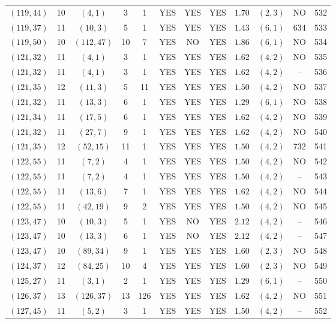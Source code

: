 \begin{longtable}{|c|c|c|c|c|c|c|c|c|c|c|c|}
$(119,44)$ & 10 & $(4,1)$ & 3 & 1 & YES & YES & YES & $1.70$ & $(2,3)$ & NO & 532\\
$(119,37)$ & 11 & $(10,3)$ & 5 & 1 & YES & YES & YES & $1.43$ & $(6,1)$ & 634 & 533\\
$(119,50)$ & 10 & $(112,47)$ & 10 & 7 & YES & NO & YES & $1.86$ & $(6,1)$ & NO & 534\\
$(121,32)$ & 11 & $(4,1)$ & 3 & 1 & YES & YES & YES & $1.62$ & $(4,2)$ & NO & 535\\
$(121,32)$ & 11 & $(4,1)$ & 3 & 1 & YES & YES & YES & $1.62$ & $(4,2)$ & -- & 536\\
$(121,35)$ & 12 & $(11,3)$ & 5 & 11 & YES & YES & YES & $1.50$ & $(4,2)$ & NO & 537\\
$(121,32)$ & 11 & $(13,3)$ & 6 & 1 & YES & YES & YES & $1.29$ & $(6,1)$ & NO & 538\\
$(121,34)$ & 11 & $(17,5)$ & 6 & 1 & YES & YES & YES & $1.62$ & $(4,2)$ & NO & 539\\
$(121,32)$ & 11 & $(27,7)$ & 9 & 1 & YES & YES & YES & $1.62$ & $(4,2)$ & NO & 540\\
$(121,35)$ & 12 & $(52,15)$ & 11 & 1 & YES & YES & YES & $1.50$ & $(4,2)$ & 732 & 541\\
$(122,55)$ & 11 & $(7,2)$ & 4 & 1 & YES & YES & YES & $1.50$ & $(4,2)$ & NO & 542\\
$(122,55)$ & 11 & $(7,2)$ & 4 & 1 & YES & YES & YES & $1.50$ & $(4,2)$ & -- & 543\\
$(122,55)$ & 11 & $(13,6)$ & 7 & 1 & YES & YES & YES & $1.62$ & $(4,2)$ & NO & 544\\
$(122,55)$ & 11 & $(42,19)$ & 9 & 2 & YES & YES & YES & $1.50$ & $(4,2)$ & NO & 545\\
$(123,47)$ & 10 & $(10,3)$ & 5 & 1 & YES & NO & YES & $2.12$ & $(4,2)$ & -- & 546\\
$(123,47)$ & 10 & $(13,3)$ & 6 & 1 & YES & NO & YES & $2.12$ & $(4,2)$ & -- & 547\\
$(123,47)$ & 10 & $(89,34)$ & 9 & 1 & YES & YES & YES & $1.60$ & $(2,3)$ & NO & 548\\
$(124,37)$ & 12 & $(84,25)$ & 10 & 4 & YES & YES & YES & $1.60$ & $(2,3)$ & NO & 549\\
$(125,27)$ & 11 & $(3,1)$ & 2 & 1 & YES & YES & YES & $1.29$ & $(6,1)$ & -- & 550\\
$(126,37)$ & 13 & $(126,37)$ & 13 & 126 & YES & YES & YES & $1.62$ & $(4,2)$ & NO & 551\\
$(127,45)$ & 11 & $(5,2)$ & 3 & 1 & YES & YES & YES & $1.50$ & $(4,2)$ & -- & 552\\

\end{longtable}
